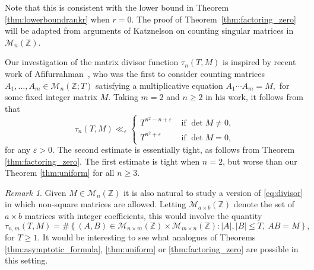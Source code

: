 \documentclass[11pt,reqno]{amsart}
\theoremstyle{definition}
\theoremstyle{remark}
\newtheorem{remark}[thm]{Remark}
\numberwithin{equation}{section}
\numberwithin{thm}{section}
\numberwithin{table}{section}
\def\cM{{\mathcal M}}
\def \Z {{\mathbb Z}}
\newcommand{\ZZ}{\mathbb Z}
\newcommand{\eps}{\varepsilon}
\begin{document}
Note that this is consistent with the lower bound in  Theorem \ref{thm:lowerboundrankr} when $r=0$.
The  proof 
of Theorem~\ref{thm:factoring_zero} will be adapted from arguments  of Katznelson \cite{katznelson} on counting singular matrices in $\mathcal{M}_n(\Z)$. 



\medskip

Our investigation of  the matrix divisor function $\tau_n(T,M)$ is  inspired by recent work  of 
Afifurrahman~\cite{Afif}, who was the first  to consider counting matrices  $A_1,\ldots,A_m\in\cM_n(\Z;T)$ satisfying a multiplicative equation
$
A_1\cdots A_m=M,
$
for some fixed integer matrix $M$.  Taking $m=2$ and $n\geq 2$ in his work, it  follows from \cite[Theorem~2.1]{Afif} that 
$$
\tau_n(T,M)\ll_\eps
\begin{cases}
T^{n^2-n+\eps} & \text{ if $\det M\neq 0$,}\\
T^{n^2+\eps} & \text{ if $\det M= 0$,}
\end{cases}
$$
for any $\eps>0$. The second estimate is essentially tight, as follows from 
Theorem \ref{thm:factoring_zero}. The first estimate is tight when $n=2$, but worse than our Theorem \ref{thm:uniform} for all $n\geq 3$. 







\begin{remark}
Given $M\in \mathcal{M}_n(\ZZ)$ it is also natural to study a version of 
\eqref{eq:divisor} in which non-square matrices are allowed. 
Letting $\mathcal{M}_{a\times b}(\ZZ)$ denote the set of $a\times b$ matrices with integer coefficients, this would involve the quantity
$$
\tau_{n,m}(T,M)=\#\left\{(A,B)\in \mathcal{M}_{n\times m}(\ZZ)\times 
\mathcal{M}_{m\times n}(\ZZ): |A|,|B|\leq T, ~AB=M\right\},
$$
for $T\geq 1$.  It would be interesting to see what analogues of Theorems \ref{thm:asymptotic_formula}, \ref{thm:uniform} 
or \ref{thm:factoring_zero}
are possible in this setting. 
\end{remark}
\end{document}
